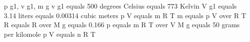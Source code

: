 p g1, v g1, m g
v g1 equals 500 degrees Celsius equals 773 Kelvin
V g1 equals 3.14 liters equals 0.00314 cubic meters
p V equals m R T
m equals p V over R T
R equals R over M g equals 0.166
p equals m R T over V
M g equals 50 grams per kilomole
p V equals n R T